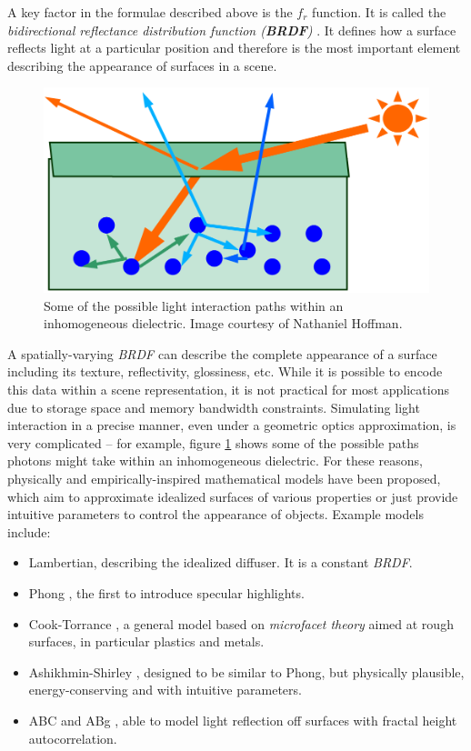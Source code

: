A key factor in the formulae described above is the $f_r$ function. It is called the \emph{bidirectional reflectance distribution function (\textbf{BRDF})} \cite{Nicodemus:65}. It defines how a surface reflects light at a particular position and therefore is the most important element describing the appearance of surfaces in a scene.

\begin{figure}[h!]
  \centering
    \includegraphics[width=0.4\linewidth]{./Chapters/InhomogeneousDielectric.png}
    \caption[Inhomogeneous dielectric]{Some of the possible light interaction paths within an inhomogeneous dielectric. Image courtesy of Nathaniel Hoffman.}
  \label{fig:InhomogeneousDielectric}
\end{figure}

A spatially-varying \emph{BRDF} can describe the complete appearance of a surface including its texture, reflectivity, glossiness, etc. While it is possible to encode this data within a scene representation, it is not practical for most applications due to storage space and memory bandwidth constraints. Simulating light interaction in a precise manner, even under a geometric optics approximation, is very complicated -- for example, figure \ref{fig:InhomogeneousDielectric} shows some of the possible paths photons might take within an inhomogeneous dielectric. For these reasons, physically and empirically-inspired mathematical models have been proposed, which aim to approximate idealized surfaces of various properties or just provide intuitive parameters to control the appearance of objects. Example models include:
\begin{itemize}
\item Lambertian, describing the idealized diffuser. It is a constant \emph{BRDF}.
\item Phong \cite{Phong}, the first to introduce specular highlights.
\item Cook-Torrance \cite{CookTorrance}, a general model based on \emph{microfacet theory} aimed at rough surfaces, in particular plastics and metals.
\item Ashikhmin-Shirley \cite{Ashikhmin00ananisotropic}, designed to be similar to Phong, but physically plausible, energy-conserving and with intuitive parameters.
\item ABC and ABg \cite{opticalScattering}, able to model light reflection off surfaces with fractal height autocorrelation.
\end{itemize}

